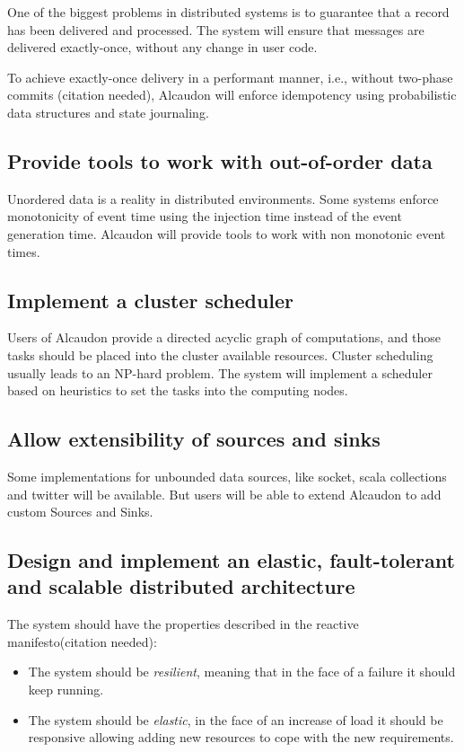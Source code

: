 One of the biggest problems in distributed systems is to guarantee that a record
has been delivered and processed. The system will ensure that messages are
delivered exactly-once, without any change in user code.

To achieve exactly-once delivery in a performant manner, i.e., without two-phase
commits (citation needed), Alcaudon will enforce idempotency using probabilistic
data structures and state journaling.

\subsection{Provide tools to work with out-of-order data}

Unordered data is a reality in distributed environments. Some systems enforce
monotonicity of event time using the injection time instead of the event
generation time. Alcaudon will provide tools to work with non monotonic event
times.

\subsection{Implement a cluster scheduler}

Users of Alcaudon provide a directed acyclic graph of computations, and those
tasks should be placed into the cluster available resources. Cluster scheduling
usually leads to an NP-hard problem. The system will implement a scheduler based
on heuristics to set the tasks into the computing nodes.


\subsection{Allow extensibility of sources and sinks}
Some implementations for unbounded data sources, like socket, scala collections
and twitter will be available. But users will be able to extend Alcaudon to add
custom Sources and Sinks.

\subsection{Design and implement an elastic, fault-tolerant and scalable distributed architecture}
The system should have the properties described in the reactive manifesto(citation needed):

\begin{itemize}
  \item The system should be \textit{resilient}, meaning that in the face of a failure it should keep running.
  \item The system should be \textit{elastic}, in the face of an increase of load it
    should be responsive allowing adding new resources to cope with the new
    requirements.
\end{itemize}

